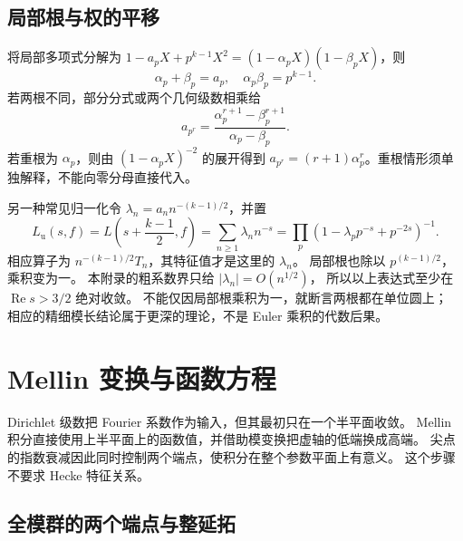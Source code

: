 \subsection{局部根与权的平移}
\label{b3:subsec:E0303}

将局部多项式分解为
\(1-a_pX+p^{k-1}X^2=(1-\alpha_pX)(1-\beta_pX)\)，则
\[
 \alpha_p+\beta_p=a_p,\quad \alpha_p\beta_p=p^{k-1}.
\]
若两根不同，部分分式或两个几何级数相乘给
\[
 a_{p^r}=\frac{\alpha_p^{r+1}-\beta_p^{r+1}}{\alpha_p-\beta_p}.
\]
若重根为 \(\alpha_p\)，则由 \((1-\alpha_pX)^{-2}\) 的展开得到
\(a_{p^r}=(r+1)\alpha_p^r\)。重根情形须单独解释，不能向零分母直接代入。

\ProseParagraphBreak

另一种常见归一化令
\(\lambda_n=a_n n^{-(k-1)/2}\)，并置
\[
 L_{\mathrm u}(s,f)=L\left(s+\frac{k-1}2,f\right)
 =\sum_{n\ge1}\lambda_n n^{-s}
 =\prod_p(1-\lambda_pp^{-s}+p^{-2s})^{-1}.
\]
相应算子为 \(n^{-(k-1)/2}T_n\)，其特征值才是这里的 \(\lambda_n\)。
局部根也除以 \(p^{(k-1)/2}\)，乘积变为一。
本附录的粗系数界只给 \(|\lambda_n|=O(n^{1/2})\)，
所以以上表达式至少在 \(\operatorname{Re}s>3/2\) 绝对收敛。
不能仅因局部根乘积为一，就断言两根都在单位圆上；
相应的精细模长结论属于更深的理论，不是 Euler 乘积的代数后果。

\section{Mellin 变换与函数方程}
\label{b3:sec:E04}

Dirichlet 级数把 Fourier 系数作为输入，但其最初只在一个半平面收敛。
Mellin 积分直接使用上半平面上的函数值，并借助模变换把虚轴的低端换成高端。
尖点的指数衰减因此同时控制两个端点，使积分在整个参数平面上有意义。
这个步骤不要求 Hecke 特征关系。

\subsection{全模群的两个端点与整延拓}
\label{b3:subsec:E0401}

